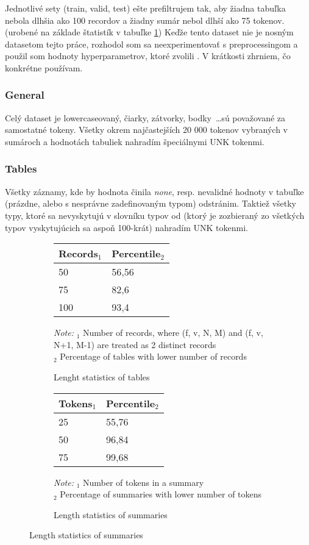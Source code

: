 Jednotlivé sety (train, valid, test) ešte prefiltrujem tak, aby žiadna tabuľka nebola dlhšia ako 100 recordov a žiadny sumár nebol dlhší ako 75 tokenov. (urobené na základe štatistík v tabuľke \ref{stats_filtering_wb}) Keďže tento dataset nie je nosným datasetom tejto práce, rozhodol som sa neexperimentovať s preprocessingom a použil som hodnoty hyperparametrov, ktoré zvolili \citep{liu2017tabletotext}. V krátkosti zhrniem, čo konkrétne používam.

\subsubsection{General}

Celý dataset je lowercaseovaný, čiarky, zátvorky, bodky \dots sú považované za samostatné tokeny. Všetky okrem najčastejších 20 000 tokenov vybraných \citep{liu2017tabletotext} v sumároch a hodnotách tabuliek nahradím špeciálnymi UNK tokenmi.

\subsubsection{Tables}

Všetky záznamy, kde by hodnota činila \emph{none}, resp. nevalidné hodnoty v tabuľke (prázdne, alebo s nesprávne zadefinovaným typom) odstránim. Taktiež všetky typy, ktoré sa nevyskytujú v slovníku typov od \citep{liu2017tabletotext} (ktorý je zozbieraný zo všetkých typov vyskytujúcich sa aspoň 100-krát) nahradím UNK tokenmi.

\begin{figure}[!h]
\centering
\begin{subfigure}[t]{0.45\textwidth}
    \centering
    \begin{tabular}{ll}
        \toprule
        Records$_1$ & Percentile$_2$\\
        \midrule
        50     & 56,56 \\
        75     & 82,6 \\
        100    & 93,4
    \end{tabular}
\caption{Lenght statistics of tables}
\footnotesize \textit{Note:} $_1$ Number of records, where (f, v, N, M) and (f, v, N+1, M-1) are treated as 2 distinct records \\ $_2$ Percentage of tables with lower number of records
\end{subfigure}
\begin{subfigure}[t]{0.45\textwidth}
    \centering
    \begin{tabular}{ll}
        \toprule
        Tokens$_1$ & Percentile$_2$\\
        \midrule
        25     & 55,76 \\
        50     & 96,84 \\
        75     & 99,68
    \end{tabular}
    \caption{Length statistics of  summaries}
    \footnotesize \textit{Note:} $_1$ Number of tokens in a summary \\ $_2$ Percentage of summaries with lower number of tokens
\end{subfigure}
 \label{stats_filtering_wb}
\end{figure}

